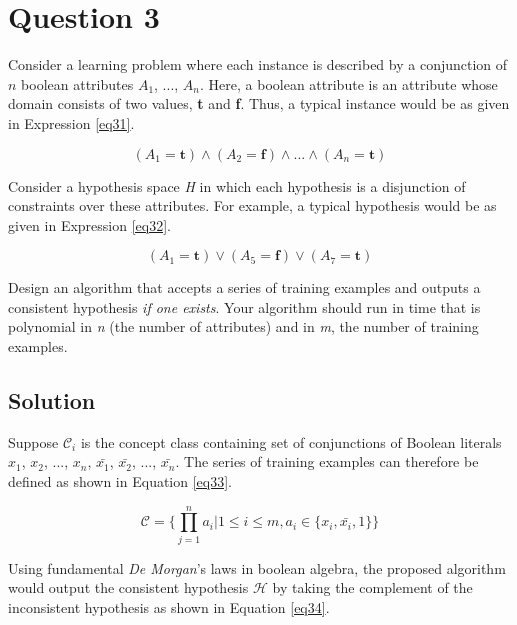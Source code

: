 \section*{Question 3}

Consider a learning problem where each instance is described by a conjunction of $n$ boolean attributes $A_1$, ..., $A_n$. Here, a boolean attribute is an attribute whose domain consists of two values, \textbf{t} and \textbf{f}. Thus, a typical instance would be as given in Expression \ref{eq31}.

\begin{equation}\label{eq31}
(A_1 = \textbf{t}) \wedge (A_2 = \textbf{f}) \wedge ... \wedge (A_n = \textbf{t})
\end{equation}

Consider a hypothesis space \textit{H} in which each hypothesis is a disjunction of constraints over these attributes. For example, a typical hypothesis would be as given in Expression \ref{eq32}.

\begin{equation}\label{eq32}
(A_1 = \textbf{t}) \vee (A_5 = \textbf{f}) \vee (A_7 = \textbf{t})
\end{equation}

Design an algorithm that accepts a series of training examples and outputs a consistent hypothesis \textit{if one exists}. Your algorithm should run in time that is polynomial in \textit{n} (the number of attributes) and in \textit{m}, the number of training examples.

\subsection*{Solution}

Suppose $\mathcal{C}_i$ is the concept class containing set of conjunctions of Boolean literals $x_1$, $x_2$, ..., $x_n$, $\bar{x_1}$, $\bar{x_2}$, ..., $\bar{x_n}$. The series of training examples can therefore be defined as shown in Equation \ref{eq33}.

\begin{equation}\label{eq33}
\mathcal{C} = \{\prod_{j=1}^{n} a_i | 1 \leq i \leq m, a_i \in \{x_i, \bar{x_i}, 1\}\}
\end{equation}

Using fundamental \textit{De Morgan}'s laws in boolean algebra, the proposed algorithm would output the consistent hypothesis $\mathcal{H}$ by taking the complement of the inconsistent hypothesis as shown in Equation \ref{eq34}.


